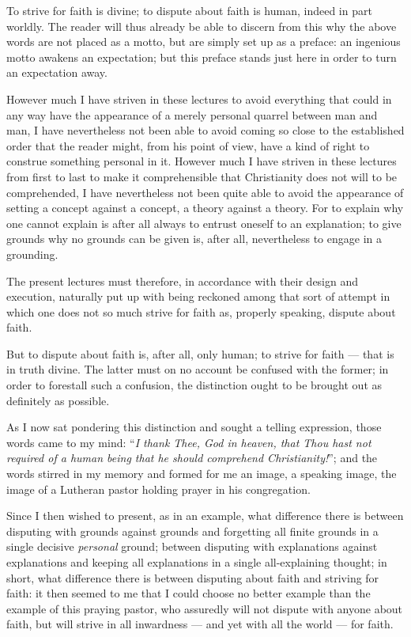 \documentclass[12pt,a4paper]{book}
\begin{document}
To strive for faith is divine; to dispute about faith is human, indeed in part
worldly. The reader will thus already be able to discern from this why the
above words are not placed as a motto, but are simply set up as a preface: an
ingenious motto awakens an expectation; but this preface stands just here in
order to turn an expectation away.

However much I have striven in these lectures to avoid everything that could
in any way have the appearance of a merely personal quarrel between man and
man, I have nevertheless not been able to avoid coming so close to the
established order that the reader might, from his point of view, have a kind of
right to construe something personal in it. However much I have striven in
these lectures from
first to last to make it comprehensible that Christianity does not will to be
comprehended, I have nevertheless not been quite able to avoid the appearance
of setting a concept against a concept, a theory against a theory. For to
explain why one cannot explain is after all always to entrust oneself to an
explanation; to give grounds why no grounds can be given is, after all,
nevertheless to engage in a grounding.

The present lectures must therefore, in accordance with their design and
execution, naturally put up with being reckoned among that sort of attempt in
which one does not so much strive for faith as, properly speaking, dispute
about faith.

But to dispute about faith is, after all, only human; to strive for faith ---
that is in truth divine. The latter must on no account be confused with the
former; in order to forestall such a confusion, the distinction ought to be
brought out as definitely as possible.

As I now sat pondering this distinction and sought a telling expression, those
words came to my mind: ``\emph{I thank Thee, God in heaven, that Thou hast not
required of a human being that he should comprehend Christianity!}''; and the
words stirred in my memory and formed for me an image, a speaking image, the
image of a Lutheran pastor holding prayer in his congregation.

Since I then wished to present, as in an example, what difference there is
between disputing with grounds against grounds and forgetting all finite
grounds in a single decisive \emph{personal} ground; between disputing with
explanations against explanations and keeping all explanations in a single
all-explaining thought; in short, what difference there is between disputing
about faith and striving for faith: it then seemed to me that I could choose no
better example than the example of this praying pastor, who assuredly will not
dispute with anyone about faith, but will strive in all inwardness --- and yet
with all the world --- for faith.
\end{document}
